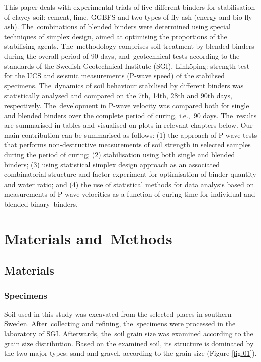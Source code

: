 \documentclass[materials,article,accept,pdftex,moreauthors]{Definitions/mdpi}
\begin{document}
{This paper deals with experimental trials of five different binders for stabilisation of clayey soil: cement, lime, GGBFS and two types of fly ash (energy and bio fly ash). The~combinations of blended binders were determined using special techniques of simplex design, aimed at optimising the proportions of the stabilising agents. The~methodology comprises soil treatment by blended binders during the overall period of 90 days, and~geotechnical tests according to the standards of the Swedish Geotechnical Institute (SGI), Link\"{o}ping: strength test for the UCS and seismic measurements (P-wave speed) of the stabilised specimens. The~dynamics of soil behaviour stabilised by different binders was statistically analysed and compared on the 7th, 14th, 28th and 90th days, respectively. The~development in P-wave velocity was compared both for single and blended binders over the complete period of curing, i.e.,~90 days. The~results are summarised in tables and visualised on plots in relevant chapters below. Our main contribution can be summarised as follows: (1) the approach of P-wave tests that performs non-destructive measurements of soil strength in selected samples during the period of curing; (2) stabilisation using both single and blended binders; (3) using statistical simplex design approach as an associated combinatorial structure and factor experiment for optimisation of binder quantity and water ratio; and (4) the use of statistical methods for data analysis based on measurements of P-wave velocities as a function of curing time for individual and blended binary~binders. 

\section{Materials and~Methods}

\subsection{Materials}


\subsubsection{Specimens}
Soil used in this study was excavated from the selected places in southern Sweden. After~collecting and refining, the~specimens were processed in the laboratory of SGI. Afterwards, the~soil grain size was examined according to the grain size distribution. Based on the examined soil, its structure is dominated by the two major types: sand and gravel, according to the grain size (Figure \ref{fig:01}). 

}
\end{document}
